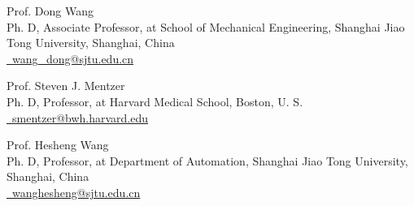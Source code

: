 \begin{cventries}
  \cventry
    {} %
    {} %
    {} %
    {} %
    {
      \vspace{-4.0mm}         
      \begin{cvitems} %
          \item { Prof. Dong Wang\\
                Ph. D, Associate Professor,  at School of Mechanical Engineering, Shanghai Jiao Tong University,
        Shanghai, China\\ 
           \href{mailto:wang_dong@sjtu.edu.cn}{\faEnvelope \ {wang\_dong@sjtu.edu.cn}} 
        }
        \vspace{2mm}
          \item { Prof. Steven J. Mentzer\\
                Ph. D, Professor,  at Harvard Medical School,
        Boston, U. S. \\ 
           \href{mailto:smentzer@bwh.harvard.edu}{\faEnvelope \ {smentzer@bwh.harvard.edu}} 
        }
        \vspace{2mm}
        \item { Prof. Hesheng Wang\\
                Ph. D, Professor,  at Department of Automation, Shanghai Jiao Tong University,
        Shanghai, China\\ 
           \href{mailto:wanghesheng@sjtu.edu.cn}{\faEnvelope \ {wanghesheng@sjtu.edu.cn}} 
        }
      \end{cvitems}
    }

\end{cventries}
